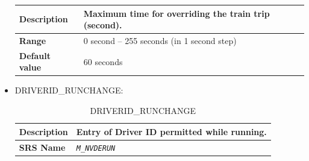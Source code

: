 \documentclass{template/openetcs}
\begin{document}
\begin{itemize}
\begin{longtable}{|l|l|}
					\begin{minipage}[t]{0.22\linewidth} \textbf{Description}	\end{minipage} 
				&	\begin{minipage}[t]{0.78\linewidth} Maximum time for overriding the train trip (second). \end{minipage} \\
				
				\hline
																																				
					\begin{minipage}[t]{0.22\linewidth} \textbf{Range}	\end{minipage} 
				&	\begin{minipage}[t]{0.78\linewidth} 0 second – 255 seconds (in 1 second step) \end{minipage} \\
								
				\hline
										
					\begin{minipage}[t]{0.22\linewidth} \textbf{Default value}	\end{minipage} 
				&	\begin{minipage}[t]{0.78\linewidth} 60 seconds \end{minipage} \\
				
				\hline
				
			\end{longtable}
					
		\item DRIVERID\_RUNCHANGE:
		
			\begin{longtable}{|l|l|}
				\caption{DRIVERID\_RUNCHANGE}\\ 																				
				\hline
				
					\begin{minipage}[t]{0.22\linewidth} \textbf{Description}	\end{minipage} 
				&	\begin{minipage}[t]{0.78\linewidth} Entry of Driver ID permitted while running. \end{minipage} \\
				
				\hline
				
					\begin{minipage}[t]{0.22\linewidth} \textbf{SRS Name}	\end{minipage} 
				&	\begin{minipage}[t]{0.78\linewidth} \emph{\texttt{M\_NVDERUN}} \end{minipage} \\
				

\end{longtable}
\end{itemize}
\end{document}
